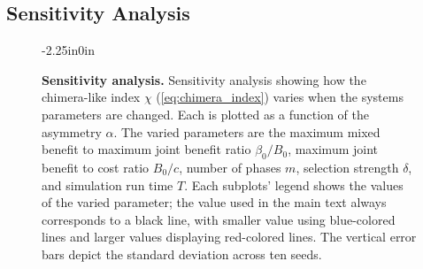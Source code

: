 \documentclass[10pt,letterpaper]{article}
\begin{document}
\subsection{Sensitivity Analysis}
\label{sec:sensitivity-analysis}
\begin{figure}
\begin{adjustwidth}{-2.25in}{0in}
  \centering
  \begin{subcaptiongroup}
      {\label{fig:sensitivity-analysis-T}\captiontext*{}}{%
      {\label{fig:sensitivity-analysis-delta}\captiontext*{}}{%
      {\label{fig:sensitivity-analysis-m}\captiontext*{}}{%
      {\label{fig:sensitivity-analysis-B}\captiontext*{}}{%
      {\label{fig:sensitivity-analysis-beta}\captiontext*{}}{%
		{}%
  }}}}}
  \end{subcaptiongroup}
  \caption{
    \textbf{
			Sensitivity analysis.
    }
		Sensitivity analysis showing how the chimera-like index $\chi$
		(\cref{eq:chimera_index})
		varies when the systems parameters are changed.
		Each is plotted as a function of the asymmetry $\alpha$.
		The varied parameters are the
		maximum mixed benefit to maximum joint benefit ratio
		$\beta_0/B_0$,
		maximum joint benefit to cost ratio $B_0/c$,
		number of phases $m$,
		selection strength $\delta$,
		and
		simulation run time $T$.
		Each subplots' legend shows the values of the
		varied parameter;
		the value used in the main text always corresponds to a black line,
		with smaller value using blue-colored lines and larger values
		displaying red-colored lines.
		The vertical error bars depict the standard deviation
		across ten seeds.
  }\label{fig:sensitivity-analysis}
\end{adjustwidth}
\end{figure}
\end{document}
